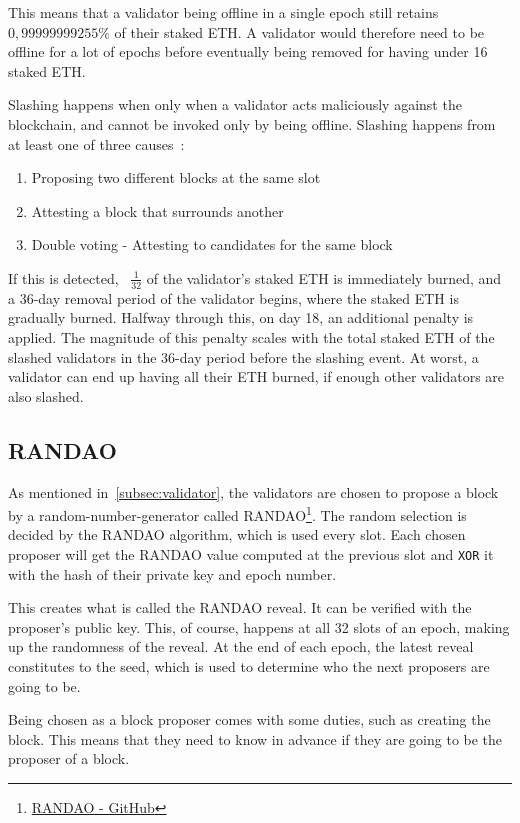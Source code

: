 This means that a validator being offline in a single epoch still retains $0,99999999255\%$ of their staked ETH\@.
A validator would therefore need
to be offline for a lot of epochs before eventually being removed for having under 16 staked ETH\@.


Slashing happens when only when a validator acts maliciously against the blockchain,
and cannot be invoked only by being offline.
Slashing happens from at least one of three causes~\cite{PoSRewAndPen}:
\begin{enumerate}
    \item Proposing two different blocks at the same slot
    \item Attesting a block that surrounds another
    \item Double voting - Attesting to candidates for the same block
\end{enumerate}
If this is detected, ~$\frac{1}{32}$ of the validator's staked ETH is immediately burned,
and a 36-day removal period of the validator begins, where the staked ETH is gradually burned.
Halfway through this, on day 18, an additional penalty is applied.
The magnitude of this penalty scales with the total staked ETH of the slashed validators in the 36-day period before the slashing event.
At worst, a validator can end up having all their ETH burned, if enough other validators are also slashed.

\subsection{RANDAO}\label{subsec:randao}
As mentioned in~\autoref{subsec:validator}, the validators are chosen to propose a block by a random-number-generator called RANDAO\footnote{\href{https://github.com/randao/randao}{RANDAO - GitHub}}.
The random selection is decided by the RANDAO algorithm, which is used every slot.
Each chosen proposer will get the RANDAO value computed at the previous slot and \texttt{XOR} it with the hash of their private key and epoch number.


This creates what is called the RANDAO reveal.
It can be verified with the proposer's public key.
This, of course, happens at all 32 slots of an epoch, making up the randomness of the reveal.
At the end of each epoch, the latest reveal constitutes to the seed, which is used to determine who the next proposers are going to be.


Being chosen as a block proposer comes with some duties, such as creating the block.
This means that they need to know in advance if they are going to be the proposer of a block.

